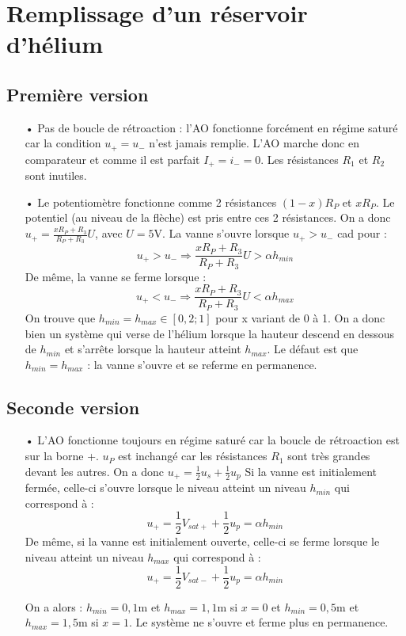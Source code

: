 \documentclass{report}
\begin{document}
\section*{Remplissage d'un réservoir d'hélium}

\subsection*{Première version}
\begin{itemize}
	\item[•] Pas de boucle de rétroaction : l'AO fonctionne forcément en régime saturé car la condition $u_+=u_-$ n'est jamais remplie. L'AO marche donc en comparateur et comme il est parfait $I_+=i_-=0$. Les résistances $R_1$ et $R_2$ sont inutiles.
	\item[•] Le potentiomètre fonctionne comme 2 résistances $(1-x)R_P$ et $xR_P$. Le potentiel (au niveau de la flèche) est pris entre ces 2 résistances. On a donc $u_+=\frac{xR_P+R_3}{R_P+R_3}U$, avec $U=5$V. La vanne s'ouvre lorsque $u_+>u_-$ cad pour :
	\begin{equation}
		u_+>u_-\Rightarrow\frac{xR_P+R_3}{R_P+R_3}U>\alpha h_{min}
	\end{equation}
	De même, la vanne se ferme lorsque :
	\begin{equation}
		u_+<	u_-\Rightarrow\frac{xR_P+R_3}{R_P+R_3}U<\alpha h_{max}
	\end{equation}
	On trouve que $h_{min}=h_{max}\in\left[ 0,2;1\right] $ pour x variant de 0 à 1.
	On a donc bien un système qui verse de l'hélium lorsque la hauteur descend en dessous de $h_{min}$ et s'arrête lorsque la hauteur atteint $h_{max}$. Le défaut est que $h_{min}=h_{max}$ : la vanne s'ouvre et se referme en permanence.
\end{itemize}

\subsection*{Seconde version}

\begin{itemize}
	\item[•] L'AO fonctionne toujours en régime saturé car la boucle de rétroaction est sur la borne +. $u_P$ est inchangé car les résistances $R_1$ sont très grandes devant les autres. On a donc $u_+=\frac{1}{2}u_s +\frac{1}{2}u_p$
	Si la vanne est initialement fermée, celle-ci s'ouvre lorsque le niveau atteint un niveau $h_{min}$ qui correspond à :
	\begin{equation}
		u_+=\frac{1}{2}V_{sat+} +\frac{1}{2}u_p=\alpha h_{min}
	\end{equation}
De même, si la vanne est initialement ouverte, celle-ci se ferme lorsque le niveau atteint un niveau $h_{max}$ qui correspond à :
	\begin{equation}
		u_+=\frac{1}{2}V_{sat-} +\frac{1}{2}u_p=\alpha h_{min}
	\end{equation}
	
	On a alors : $h_{min}=0,1$m et $h_{max}=1,1$m si $x=0$ et $h_{min}=0,5$m et $h_{max}=1,5$m si $x=1$. Le système ne s'ouvre et ferme plus en permanence.
\end{itemize}
\end{document}
